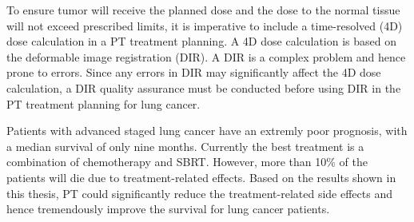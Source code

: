 To ensure tumor will receive the planned dose and the dose to the normal tissue will not exceed prescribed limits, it is imperative
to include a time-resolved (4D) dose calculation in a PT treatment planning. A 4D dose calculation is based on the deformable image registration (DIR).
A DIR is a complex problem and hence prone to errors. Since any errors in DIR may significantly affect the 4D dose calculation, a DIR
quality assurance must be conducted before using DIR in the PT treatment planning for lung cancer.

Patients with advanced staged lung cancer have an extremly poor prognosis, with a median survival of only nine months. 
Currently the best treatment is a combination of chemotherapy and SBRT. However, more than 10\% of the patients will die due to 
treatment-related effects. Based on the results shown in this thesis, PT could significantly reduce the 
treatment-related side effects and hence tremendously improve the survival for lung cancer patients.

